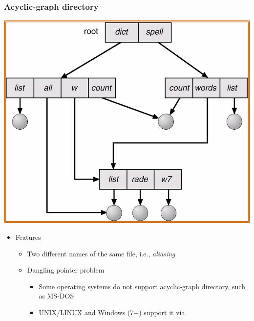 \documentclass[CJKutf8,xcolor=pdftex,dvipsnames,table]{beamer}
\begin{document}
\begin{CJK*}{UTF8}{song}
  \begin{frame}
    \frametitle{Acyclic-graph directory} \pause
    \begin{center}
      \includegraphics[scale=.4]{v6f11-9} \pause
    \end{center}
    \begin{itemize}
    \item Features \pause
      \begin{itemize}
      \item Two different names of the same file, i.e., \emph{aliasing} \pause
      \item Dangling pointer problem \pause
        \begin{itemize}
        \item Some operating systems do not support acyclic-graph directory, such as MS-DOS \pause
        \item UNIX/LINUX and Windows (7+) support it via 
        \end{itemize}
      \end{itemize}
    \end{itemize}
  \end{frame}


\end{CJK*}
\end{document}
